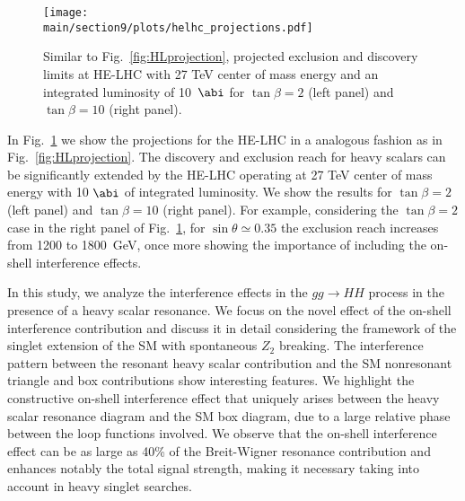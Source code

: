 \begin{figure}[t]
  \centering
\texttt{[image: \\main/section9/plots/helhc\_projections.pdf]}
  \caption{
  Similar to Fig.~\ref{fig:HLprojection}, projected exclusion and discovery limits at HE-LHC with 27 TeV center of mass energy and an integrated luminosity of 10~$\abi$ for $\tan\beta=2$ (left panel) and $\tan\beta=10$ (right panel).
  }
  \label{fig:HEprojection}
\end{figure} 

In Fig.~\ref{fig:HEprojection} we show the projections for the HE-LHC in a analogous fashion as in Fig.~\ref{fig:HLprojection}. The discovery and exclusion reach for heavy scalars can be significantly extended by the HE-LHC operating at 27 TeV center of mass energy with 10 $\abi$ of integrated luminosity. We show the results for $\tan\beta=2$ (left panel) and $\tan\beta=10$ (right panel). 
For example, considering the $\tan\beta=2$ case in the right panel of Fig.~\ref{fig:HEprojection}, for $\sin\theta\simeq 0.35$ the exclusion reach increases from 1200 to 1800~GeV, once more showing the importance of including the on-shell interference effects.

\label{sec:conclude}

In this study, we analyze the interference effects in the $gg\to HH$ process in the presence of a heavy scalar resonance.
We focus on the novel effect of the on-shell interference contribution and discuss it in detail considering the framework of the singlet extension of the SM with spontaneous $Z_2$ breaking. %
The interference pattern between the resonant heavy scalar contribution and the SM nonresonant triangle and box contributions show interesting features. 
We highlight the constructive on-shell interference effect that uniquely arises between the heavy scalar resonance diagram and the SM box diagram, due to a large relative phase between the loop functions involved.
We observe that the on-shell interference effect can be as large as 40\% of the Breit-Wigner resonance contribution and enhances notably the total signal strength, making it necessary taking into account in heavy singlet searches.

